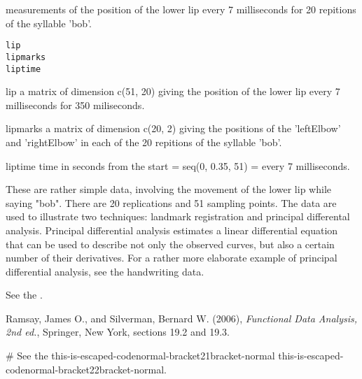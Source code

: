 \begin{Description} measurements of the position of the lower lip every 7 milliseconds
for 20 repitions of the syllable 'bob'.
\end{Description}
\begin{Usage}
\begin{verbatim}
lip
lipmarks 
liptime
\end{verbatim}
\end{Usage}
\begin{Format}\relax
\item[lip] a matrix of dimension c(51, 20) giving the position of the lower
lip every 7 milliseconds for 350 miliseconds.

\item[lipmarks] a matrix of dimension c(20, 2) giving the positions of the
'leftElbow' and 'rightElbow' in each of the 20 repitions of the
syllable 'bob'.  

\item[liptime] time in seconds from the start = seq(0, 0.35, 51) = every 7
milliseconds.  
\end{Format}
\begin{Details}\relax
These are rather simple data, involving the movement of the lower lip
while saying "bob".  There are 20 replications and 51 sampling points.
The data are used to illustrate two techniques:  landmark registration
and principal differental analysis.  
Principal differential analysis estimates a linear differential equation
that can be used to describe not only the observed curves, but also a 
certain number of their derivatives.  
For a rather more elaborate example of principal differential analysis, 
see the handwriting data.

See the  .
\end{Details}
\begin{Source}\relax
Ramsay, James O., and Silverman, Bernard W. (2006), \emph{Functional
Data Analysis, 2nd ed.}, Springer, New York, sections 19.2 and
19.3.
\end{Source}
\begin{Examples}
\begin{ExampleCode}
#  See the this-is-escaped-codenormal-bracket21bracket-normal this-is-escaped-codenormal-bracket22bracket-normal.  
\end{ExampleCode}
\end{Examples}


